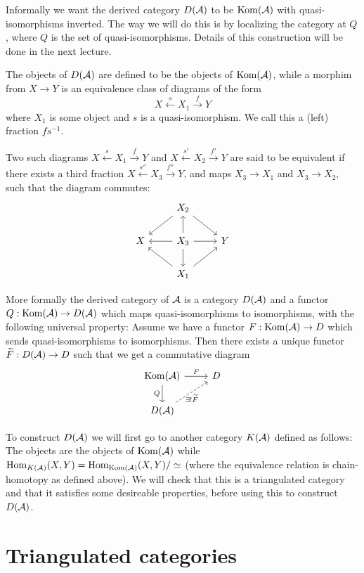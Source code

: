 \documentclass[a4paper, UKenglish]{report}
\begin{document}
Informally we want the derived category $D(\mathcal{A})$ to be $\operatorname{Kom}(\mathcal{A})$ with quasi-isomorphisms inverted. The way we will do this is by localizing the category at $Q$, where $Q$ is the set of quasi-isomorphisms. Details of this construction will be done in the next lecture.

The objects of $D(\mathcal{A})$ are defined to be the objects of $\operatorname{Kom}(\mathcal{A})$, while a morphim from $X \to Y$ is an equivalence class of diagrams of the form
\[ X \xleftarrow{s} X_1 \xrightarrow{f} Y \]
where $X_1$ is some object and $s$ is a quasi-isomorphism. We call this a (left) fraction $fs^{-1}$.

Two such diagrams $ X \xleftarrow{s} X_1 \xrightarrow{f} Y$ and $ X \xleftarrow{s'} X_2 \xrightarrow{f'} Y$ are said to be equivalent if there exists a third fraction $ X \xleftarrow{s''} X_3 \xrightarrow{f''} Y$, and maps $X_3 \to X_1$ and $X_3 \to X_2$, such that the diagram commutes:
\[
\begin{tikzcd}
  \text{ } & X_2 \arrow{dl} \arrow{dr} & \\
  X  & X_3 \arrow{l} \arrow{r} \arrow{u} \arrow{d} & Y \\
  \text{ } & X_1 \arrow{ul} \arrow{ur} & 
\end{tikzcd} 
\]


More formally the derived category of $\mathcal{A}$ is a category $D(\mathcal{A})$ and a functor $Q : \operatorname{Kom}(\mathcal{A}) \to D(\mathcal{A})$ which maps quasi-isomorphisms to isomorphisms, with the following universal property: Assume we have a functor $F: \operatorname{Kom} (\mathcal{A}) \to D$ which sends quasi-isomorphisms to isomorphisms. Then there exists a unique functor $\widetilde{F}: D(\mathcal{A}) \to D$ such that we get a commutative diagram
\[
\begin{tikzcd}
  \Kom(\AAA) \arrow[d, "Q"{left}] \ar{r}{F} & D \\
  D(\AAA) \arrow[ur, dashed, "\exists ! \widetilde{F}"{below}] & \text{ }
\end{tikzcd}
\]

To construct $D(\mathcal{A})$ we will first go to another category $K(\mathcal{A})$ defined as follows: The objects are the objects of $\operatorname{Kom}(\mathcal{A})$ while $\operatorname{Hom}_{K(\mathcal{A})}(X,Y) = \operatorname{Hom}_{\operatorname{Kom}(\mathcal{A})}(X,Y) / \simeq$ (where the equivalence relation is chain-homotopy as defined above). We will check that this is a triangulated category and that it satisfies some desireable properties, before using this to construct $D(\mathcal{A})$.

\section{Triangulated categories}
\end{document}
